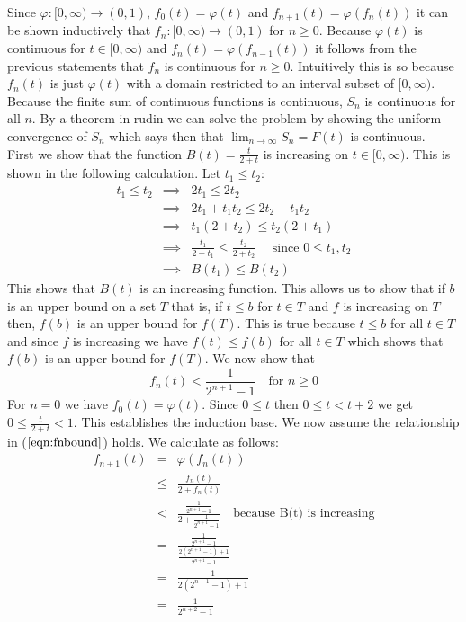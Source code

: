 \documentclass[11pt,reqno]{article}
\begin{document}
\noindent Since $\varphi : [0,\infty) \to (0,1)$, $f_0(t) = \varphi(t)$ and $f_{n+1}(t) = \varphi(f_n(t))$ it can be shown inductively that $f_n : [0,\infty) \to (0,1)$ for $n \ge 0$.  Because $\varphi(t)$ is continuous for $t \in [0,\infty)$ and $f_n(t) = \varphi(f_{n-1}(t))$ it follows from the previous statements that $f_n$ is continuous for $n \ge 0$. Intuitively this is so because $f_n(t)$ is just $\varphi(t)$ with a domain restricted to an interval subset of $[0,\infty)$. \\
\indent Because the finite sum of continuous functions is continuous, $S_n$ is continuous for all $n$. By a theorem in rudin we can solve the problem by showing the uniform convergence of $S_n$ which says then that $\lim_{n \to \infty} S_n = F(t)$ is continuous.\\
\indent First we show that the function $B(t) = \frac{t}{2+t}$ is increasing on $t \in [0,\infty)$. This is shown in the following calculation. Let $t_1 \le t_2$:
\begin{eqnarray*}
t_1 \le t_2 &\implies& 2 t_1 \le  2 t_2 \\
	       &\implies& 2 t_1 + t_1 t_2 \le  2 t_2 + t_1 t_2 \\
	       &\implies& t_1 (2 + t_2) \le t_2 (2 + t_1) \\
	       &\implies& \frac{t_1}{2 + t_1} \le  \frac{t_2}{2 + t_2}  \quad \text{ since $0 \le t_1,t_2$}\\
	       &\implies& B(t_1) \le  B(t_2)
\end{eqnarray*}
This shows that $B(t)$ is an increasing function. This allows us to show that if $b$ is an upper bound on a set $T$ that is, if $t \le b$ for $t \in T$ and $f$ is increasing on $T$ then, $f(b)$ is an upper bound for $f(T)$. This is true because $t \le b$ for all $t \in T$ and since $f$ is increasing we have $f(t) \le f(b)$ for all $t \in T$ which shows that $f(b)$ is an upper bound for $f(T)$.
We now show that 
\begin{equation}
f_n(t) < \frac{1}{2^{n+1}-1} \quad \text{for $n \ge 0$} \label{eqn:fnbound}
\end{equation}
For $n = 0$ we have $f_0(t) = \varphi(t)$. Since $0 \le t$ then $0 \le t < t + 2$ we get $0 \le \frac{t}{2+t} < 1$. This establishes the induction base. We now assume the relationship in ($\ref{eqn:fnbound}$) holds. 
\newpage
We calculate as follows:
\begin{eqnarray*}
f_{n+1}(t) &=& \varphi(f_n(t)) \\
	     &\le& \frac{f_n(t)}{2 + f_n(t)} \\
	     &<& \frac{ \frac{1}{2^{n+1}-1} }{ 2 + \frac{1}{2^{n+1}-1} } \quad \text{because B(t) is increasing}\\
	     &=&  \frac{ \frac{1}{2^{n+1}-1} }{\frac{2(2^{n+1}-1) + 1}{2^{n+1}-1} } \\
	     &=&  \frac{1}{2(2^{n+1}-1) + 1}\\
	     &=&  \frac{1}{2^{n+2}-1}\\
\end{eqnarray*}
\end{document}
